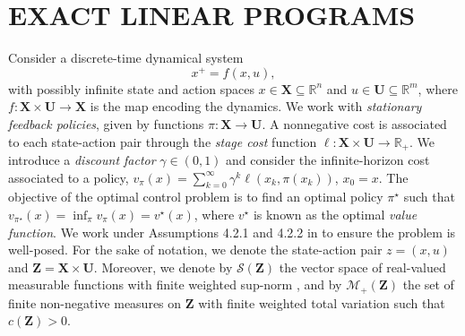 \documentclass[journal,twoside,web]{ieeecolor}
\newcommand{\Xb}{\mathbf{X}}
\newcommand{\Ub}{\mathbf{U}}
\newcommand{\Zb}{\mathbf{Z}}
\newcommand{\review}{\color{black}}
\begin{document}
\section{EXACT LINEAR PROGRAMS}

Consider a discrete-time dynamical system 
%
\begin{equation}
 x^+ = f(x,u),    
\end{equation}
%
with possibly infinite state and action spaces $x \in \mathbf{X} \subseteq \mathbb{R}^{n}$ and $u \in \mathbf{U} \subseteq \mathbb{R}^{m}$, where $f : \mathbf{X} \times \mathbf{U} \rightarrow \mathbf{X}$ is the map encoding the dynamics.	
We work with \textit{stationary feedback policies}, given by functions $\pi : \mathbf{X} \rightarrow \mathbf{U}$. A nonnegative cost is associated to each state-action pair through the \textit{stage cost} function $\ell : \mathbf{X} \times \mathbf{U} \rightarrow \mathbb{R}_{+}$. We introduce a \textit{discount factor} $\gamma \in (0,1)$ and consider the infinite-horizon cost associated to a policy,
	$v_{\pi}(x) = \sum_{k=0}^{\infty}\gamma^{k}\ell(x_k,\pi(x_k))$, $x_0 = x$.
The objective of the optimal control problem is to find an optimal policy $\pi^{\star}$ such that $v_{\pi^{\star}}(x) = \inf_{\pi} v_{\pi}(x) = v^{\star}(x)$, where $v^\star$ is known as the optimal \textit{value function}. {\review We work under Assumptions 4.2.1 and 4.2.2 in \cite{LasserreDTMCP} to ensure the problem is well-posed.} For the sake of notation, we denote the state-action pair $z=(x,u)$ and $\Zb = \Xb \times \Ub$. Moreover, we denote by $\mathcal{S}(\Zb)$ the vector space of real-valued measurable functions with finite weighted sup-norm \cite[Lemma 2.20]{LasserreDTMCP}, and by $\mathcal{M}_+(\Zb)$ the set of finite non-negative measures on $\Zb$ with finite weighted total variation such that $c(\Zb)>0$. 
\end{document}
